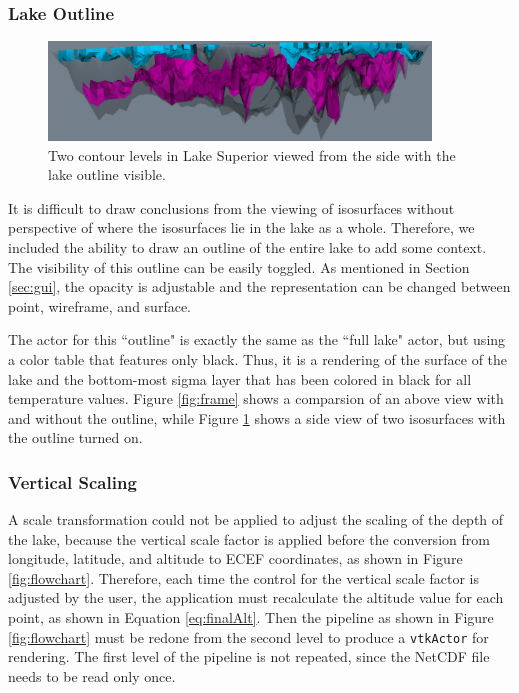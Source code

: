 \documentclass{article} %
\newcommand{\code}[1]{\texttt{#1}}
\begin{document}
\subsubsection{Lake Outline}\label{sec:lakeOutLine}

\begin{figure}[htb]
   \centering
   \includegraphics[width=4in]{figures/lakeside.eps}
   \caption{Two contour levels in Lake Superior viewed from the side with the lake outline visible.}
   \label{fig:lakeside}
\end{figure}

It is difficult to draw conclusions from the viewing of isosurfaces without perspective of where the isosurfaces lie in the lake as a whole.  Therefore, we included the ability to draw an outline of the entire lake to add some context.  The visibility of this outline can be easily toggled.  As mentioned in Section \ref{sec:gui}, the opacity is adjustable and the representation can be changed between point, wireframe, and surface.

The actor for this ``outline" is exactly the same as the ``full lake" actor, but using a color table that features only black.  Thus, it is a rendering of the surface of the lake and the bottom-most sigma layer that has been colored in black for all temperature values.  Figure \ref{fig:frame} shows a comparsion of an above view with and without the outline, while Figure \ref{fig:lakeside} shows a side view of two isosurfaces with the outline turned on.

\subsubsection{Vertical Scaling}

A scale transformation could not be applied to adjust the scaling of the depth of the lake, because the vertical scale factor is applied before the conversion from longitude, latitude, and altitude to ECEF coordinates, as shown in Figure \ref{fig:flowchart}.  Therefore, each time the control for the vertical scale factor is adjusted by the user, the application must recalculate the altitude value for each point, as shown in Equation \ref{eq:finalAlt}.  Then the pipeline as shown in Figure \ref{fig:flowchart} must be redone from the second level to produce a \code{vtkActor} for rendering.  The first level of the pipeline is not repeated, since the NetCDF file needs to be read only once.
\end{document}
